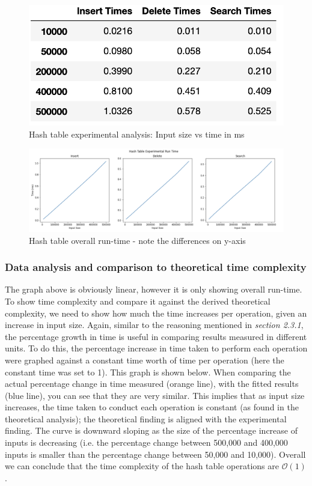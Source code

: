 \documentclass[11p]{article}
\begin{document}
\begin{figure}[hbt!]
	\centering
	\includegraphics[width=0.3\linewidth]{experimental_results/htabletable.png}
	\caption{Hash table experimental analysis: Input size vs time in ms}
\end{figure}

\begin{figure}[hbt!]
	\centering
	\includegraphics[width=0.9\linewidth]{experimental_results/htablegraph.png}
	\caption{Hash table overall run-time - note the differences on y-axis}
\end{figure}
\subsubsection{Data analysis and comparison to theoretical time complexity}
The graph above is obviously linear, however it is only showing overall run-time. To show time complexity and compare it against the derived theoretical complexity, we need to show how much the time increases per operation, given an increase in input size. Again, similar to the reasoning mentioned in \textit{section 2.3.1}, the percentage growth in time is useful in comparing results measured in different units.  To do this, the percentage increase in time taken to perform each operation were graphed against a constant time worth of time per operation (here the constant time was set to 1). This graph is shown below. When comparing the actual percentage change in time measured (orange line), with the fitted results (blue line), you can see that they are very similar. This implies that as input size increases, the time taken to conduct each operation is constant (as found in the theoretical analysis); the theoretical finding is aligned with the experimental finding. The curve is downward sloping as the size of the percentage increase of inputs is decreasing (i.e. the percentage change between 500,000 and 400,000 inputs is smaller than the percentage change between 50,000 and 10,000). Overall we can conclude that the time complexity of the hash table operations are $\mathcal{O}(1)$.
\end{document}
